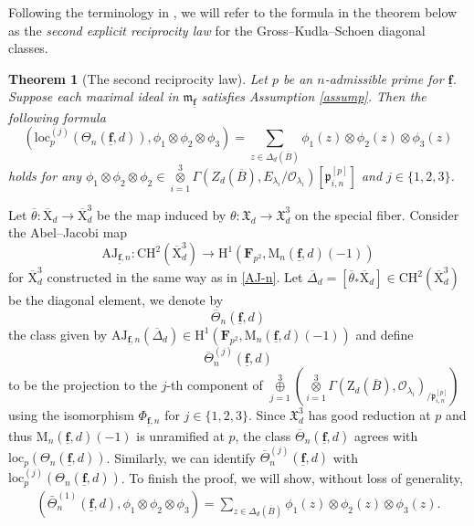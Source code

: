 \documentclass[10pt]{amsart}
\numberwithin{equation}{section}
\theoremstyle{plain}
\newtheorem{theorem}{Theorem}[section]
\numberwithin{equation}{section}
\theoremstyle{definition}
\theoremstyle{remark}
\def\loc{\mathrm{loc}}
\def\AJ{\mathrm{AJ}}
\def\frakm{\mathfrak{m}}
\def\interX{\mathfrak{X}}
\def\triplef{\underline{\mathbf{f}}}
\def\threetensor{\overset{3}{\underset{i=1}\otimes}}
\def\threesum{\overset{3}{\underset{j=1}\oplus} }
\def\calO{\mathcal{O}}
\def\frakm{\mathfrak{m}}
\def\frakp{\mathfrak{p}}
\def\FF{\mathbf{F}}
\def\rmH{\mathrm{H}}
\def\rmM{\mathrm{M}}
\def\rmX{\mathrm{X}}
\def\rmXbar{\overline{\rmX}}
\def\rmZ{\mathrm{Z}}
\begin{document}
Following the terminology in \cite{BD}, we will refer to the formula in the theorem below as the \emph{second explicit reciprocity law} for the Gross--Kudla--Schoen diagonal classes.
\begin{theorem}[The second reciprocity law]\label{2-law}
Let $p$ be an $n$-admissible prime for $\triplef$. Suppose each maximal ideal in $\frakm_{\triplef}$ satisfies Assumption \ref{assump}. Then the following formula
\begin{equation*}
(\loc^{(j)}_{p}(\Theta_{n}(\triplef, d)), \phi_{1}\otimes\phi_{2}\otimes\phi_{3})=\sum_{z\in \Delta_{d}(\overline{B})} \phi_{1}(z)\otimes \phi_{2}(z)\otimes \phi_{3}(z)
\end{equation*}
holds for any $\phi_{1}\otimes \phi_{2}\otimes \phi_{2}\in \threetensor\Gamma(Z_{d}(\overline{B}),E_{\lambda_{i}}/ \calO_{\lambda_{i}})[\frakp^{[p]}_{i, n}]$ and $j\in\{1, 2, 3\}$. 
\end{theorem}

Let $\overline{\theta}: \overline{\rmX}_{d}\rightarrow \overline{\rmX}^{3}_{d}$ be the map induced by $\theta: \interX_{d}\rightarrow\interX^{3}_{d}$ on the special fiber. Consider the Abel--Jacobi map 
\begin{equation*}
{\AJ}_{\triplef, n}: \mathrm{CH}^{2}(\overline{\rmX}^{3}_{d})\rightarrow \rmH^{1}(\FF_{p^{2}}, \rmM_{n}(\triplef, d)(-1)) 
\end{equation*}
for $\rmXbar^{3}_{d}$ constructed in the same way as in \ref{AJ-n}. Let $\overline{\Delta}_{d}=[\overline{\theta}_{\ast}\overline{\rmX}_{d}]\in  \mathrm{CH}^{2}(\overline{\rmX}^{3}_{d})$ be the diagonal element, we denote by 
\begin{equation}\label{modtheta}
\overline{\Theta}_{n}(\triplef, d) 
\end{equation}
the class given by $\mathrm{AJ}_{\triplef, n}(\overline{\Delta}_{d})\in \rmH^{1}(\FF_{p^{2}}, \rmM_{n}(\triplef,d)(-1))$ and define 
\begin{equation}\label{j-theta}
\overline{\Theta}_{n}^{(j)}(\triplef, d) 
\end{equation}
to be the projection to the $j$-th component of $\threesum(\threetensor\Gamma(\rmZ_{d}(\overline{B}), \calO_{\lambda_{i}})_{/\frakp^{[p]}_{i,n}})$
using the isomorphism $\Phi_{\triplef, n}$ for $j\in\{1, 2, 3\}$.  Since $\interX^{3}_{d}$ has good reduction at $p$ and thus $\rmM_{n}(\triplef,d)(-1)$ is unramified at $p$, the class $\overline{\Theta}_{n}(\triplef, d)$ agrees with $\loc_{p}(\Theta_{n}(\triplef, d))$. Similarly, we can identify  $\overline{\Theta}^{(j)}_{n}(\triplef, d)$ with $\loc^{(j)}_{p}(\Theta_{n}(\triplef, d))$.
To finish the proof, we will show, without loss of generality, 
\begin{equation}\label{1-finish}
\begin{aligned}
(\bar{\Theta}^{(1)}_{n}(\triplef, d), \phi_{1}\otimes\phi_{2}\otimes\phi_{3})=\sum_{z\in \Delta_{d}(\overline{B})} \phi_{1}(z)\otimes \phi_{2}(z)\otimes \phi_{3}(z).
\end{aligned}
\end{equation}
\end{document}
